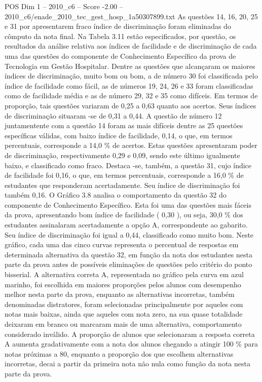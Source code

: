\begin{textsample}{POS Dim 1 – 2010\_c6 – Score -2.00 – 2010\_c6/enade\_2010\_tec\_gest\_hosp\_1a50307899.txt}
As questões 14, 16, 20, 25 e 31 por apresentarem fraco índice de discriminação foram eliminadas do cômputo da nota final.
Na Tabela 3.11 estão especificados, por questão, os resultados da análise relativa aos índices de facilidade e de discriminação de cada uma das questões do componente de Conhecimento Específico da prova de Tecnologia em Gestão Hospitalar.
Dentre as questões que alcançaram os maiores índices de discriminação, muito bom ou bom, a de número 30 foi classificada pelo índice de facilidade como fácil, as de números 19, 24, 26 e 33 foram classificadas como de facilidade média e as de número 29, 32 e 35 como difíceis.
Em termos de proporção, tais questões variaram de 0,25 a 0,63 quanto aos acertos.
Seus índices de discriminação situaram -se de 0,31 a 0,44.
A questão de número 12 juntamentente com a questão 14 foram as mais difíceis dentre as 25 questões específicas válidas, com baixo índice de facilidade, 0,14, o que, em termos percentuais, corresponde a 14,0 \% de acertos.
Estas questões apresentaram poder de discriminação, respectivamente 0,29 e 0,09, sendo este último igualmente baixo, e classificado como fraco.
Destaca -se, também, a questão 31, cujo índice de facilidade foi 0,16, o que, em termos percentuais, corresponde a 16,0 \% de estudantes que responderam acertadamente.
Seu índice de discriminação foi também 0,16.
O Gráfico 3.8 analisa o comportamento da questão 32 do componente de Conhecimento Específico.
Esta foi uma das questões mais fáceis da prova, apresentando bom índice de facilidade ( 0,30 ), ou seja, 30,0 \% dos estudantes assinalaram acertadamente a opção A, correspondente ao gabarito.
Seu índice de discriminação foi igual a 0,44, classificado como muito bom.
Neste gráfico, cada uma das cinco curvas representa o percentual de respostas em determinada alternativa da questão 32, em função da nota dos estudantes nesta parte da prova antes de possíveis eliminações de questões pelo critério do ponto bisserial.
A alternativa correta A, representada no gráfico pela curva em azul marinho, foi escolhida em maiores proporções pelos alunos com desempenho melhor nesta parte da prova, enquanto as alternativas incorretas, também denominadas distratores, foram selecionadas principalmente por aqueles com notas mais baixas, ainda que aqueles com nota zero, na sua quase totalidade deixaram em branco ou marcaram mais de uma alternativa, comportamento considerado inválido.
A proporção de alunos que selecionaram a resposta correta A aumenta gradativamente com a nota dos alunos chegando a atingir 100 \% para notas próximas a 80, enquanto a proporção dos que escolhem alternativas incorretas, decai a partir da primeira nota não nula como função da nota nesta parte da prova.

\end{textsample}
